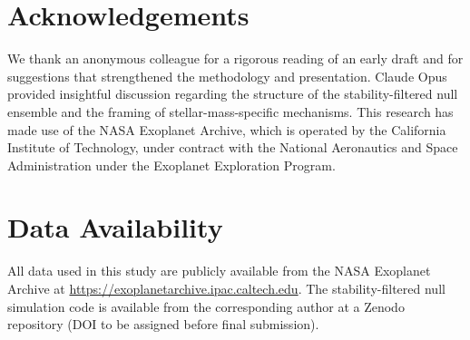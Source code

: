 \documentclass[twocolumn,usenatbib]{mnras}
\begin{document}
\section{Acknowledgements}

We thank an anonymous colleague for a rigorous reading of an early draft and
for suggestions that strengthened the methodology and presentation. Claude
Opus provided insightful discussion regarding the structure of the
stability-filtered null ensemble and the framing of stellar-mass-specific
mechanisms. This research has made use of the NASA Exoplanet Archive, which is
operated by the California Institute of Technology, under contract with the
National Aeronautics and Space Administration under the Exoplanet Exploration
Program.

\section*{Data Availability}

All data used in this study are publicly available from the NASA Exoplanet
Archive at \url{https://exoplanetarchive.ipac.caltech.edu}. The
stability-filtered null simulation code is available from the corresponding
author at a Zenodo repository (DOI to be assigned before final submission).




\label{lastpage}
\end{document}
